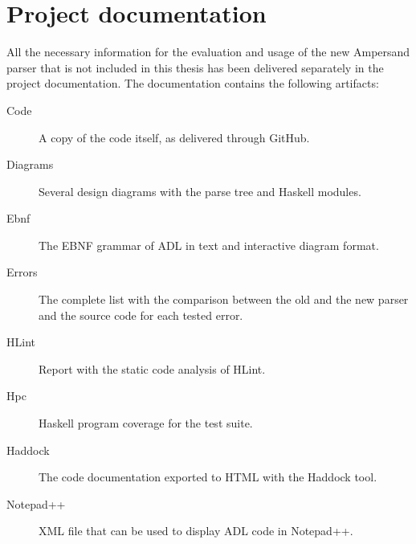
\section*{Project documentation}
\label{app:docs}
All the necessary information for the evaluation and usage of the new Ampersand parser that is not included in this thesis has been delivered separately in the project documentation.
The documentation contains the following artifacts:
\begin{description}
  \item [Code] A copy of the code itself, as delivered through GitHub.
  \item [Diagrams] Several design diagrams with the parse tree and Haskell modules.
  \item [Ebnf] The EBNF grammar of ADL in text and interactive diagram format.
  \item [Errors] The complete list with the comparison between the old and the new parser and the source code for each tested error.
  \item [HLint] Report with the static code analysis of HLint.
  \item [Hpc] Haskell program coverage for the test suite.
  \item [Haddock] The code documentation exported to HTML with the Haddock tool.
  \item [Notepad++] XML file that can be used to display ADL code in Notepad++.
\end{description}
